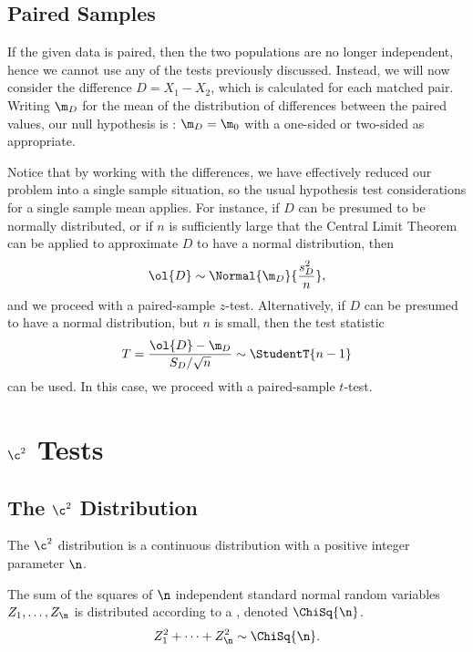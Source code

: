 \subsection{Paired Samples}

If the given data is paired, then the two populations are no longer independent, hence we cannot use any of the tests previously discussed. Instead, we will now consider the difference $D = X_1 - X_2$, which is calculated for each matched pair. Writing $\m_D$ for the mean of the distribution of differences between the paired values, our null hypothesis is \nullhyp: $\m_D = \m_0$ with a one-sided or two-sided \althyp{} as appropriate.

Notice that by working with the differences, we have effectively reduced our problem into a single sample situation, so the usual hypothesis test considerations for a single sample mean applies. For instance, if $D$ can be presumed to be normally distributed, or if $n$ is sufficiently large that the Central Limit Theorem can be applied to approximate $D$ to have a normal distribution, then \[\ol{D} \sim \Normal{\m_D}{\frac{s_D^2}{n}},\] and we proceed with a paired-sample $z$-test. Alternatively, if $D$ can be presumed to have a normal distribution, but $n$ is small, then the test statistic \[T = \frac{\ol{D} - \m_D}{S_D / \sqrt{n}} \sim \StudentT{n-1}\] can be used. In this case, we proceed with a paired-sample $t$-test.

\section{\texorpdfstring{$\c^2$}{Chi-Squared} Tests}

\subsection{The \texorpdfstring{$\c^2$}{Chi-Squared} Distribution}

The $\c^2$ distribution is a continuous distribution with a positive integer parameter $\n$.

\begin{definition}
    The sum of the squares of $\n$ independent standard normal random variables $Z_1, \dots, Z_\n$ is distributed according to a , denoted $\ChiSq{\n}$. \[Z_1^2 + \dots + Z_\n^2 \sim \ChiSq{\n}.\]
\end{definition}

